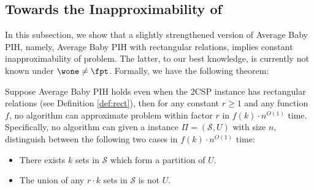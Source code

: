 \subsection{Towards the Inapproximability of \kexact}
In this subsection, we show that a slightly strengthened version of Average Baby PIH, namely, Average Baby PIH with rectangular relations, implies constant inapproximability of \kexact{} problem. The latter, to our best knowledge, is currently not known under $\wone \neq \fpt$. Formally, we have the following theorem:
\begin{theorem}\label{thm:exactcover}
    Suppose Average Baby PIH holds even when the 2CSP instance has rectangular relations (see Definition \ref{def:rect}), then for any constant $r \ge 1$ and any function $f$, no algorithm can approximate \kexact{} problem within factor $r$ in $f(k)\cdot n^{O(1)}$ time. Specifically, no algorithm can given a \ksetcover{} instance $\Pi=(\mathcal S,U)$ with size $n$, distinguish between the following two cases in $f(k)\cdot n^{O(1)}$ time:
    \begin{itemize}
        \item There exists $k$ sets in $\mathcal S$ which form a partition of $U$.
        \item The union of any $r\cdot k$ sets in $\mathcal S$ is not $U$.
    \end{itemize}
\end{theorem}
